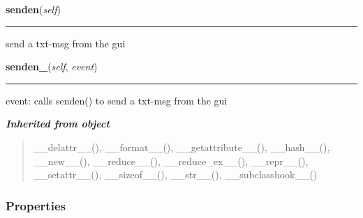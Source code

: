     \label{gui:gui:senden}

    \vspace{0.5ex}

\hspace{.8\funcindent}\begin{boxedminipage}{\funcwidth}

    \raggedright \textbf{senden}(\textit{self})

    \vspace{-1.5ex}

    \rule{\textwidth}{0.5\fboxrule}
\setlength{\parskip}{2ex}
    send a txt-msg from the gui

\setlength{\parskip}{1ex}
    \end{boxedminipage}

    \label{gui:gui:senden_}

    \vspace{0.5ex}

\hspace{.8\funcindent}\begin{boxedminipage}{\funcwidth}

    \raggedright \textbf{senden\_}(\textit{self}, \textit{event})

    \vspace{-1.5ex}

    \rule{\textwidth}{0.5\fboxrule}
\setlength{\parskip}{2ex}
    event: calls senden() to send a txt-msg from the gui

\setlength{\parskip}{1ex}
    \end{boxedminipage}


\large{\textbf{\textit{Inherited from object}}}

\begin{quote}
\_\_delattr\_\_(), \_\_format\_\_(), \_\_getattribute\_\_(), \_\_hash\_\_(), \_\_new\_\_(), \_\_reduce\_\_(), \_\_reduce\_ex\_\_(), \_\_repr\_\_(), \_\_setattr\_\_(), \_\_sizeof\_\_(), \_\_str\_\_(), \_\_subclasshook\_\_()
\end{quote}


  \subsubsection{Properties}

